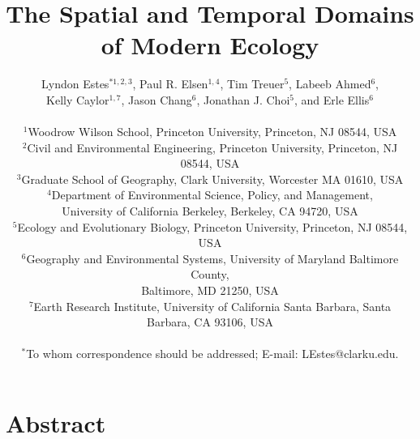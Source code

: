 \documentclass[12pt]{article}
\title{The Spatial and Temporal Domains of Modern Ecology }%
\author
{Lyndon Estes$^{\ast1, 2, 3}$, Paul R. Elsen$^{1, 4}$, Tim Treuer$^{5}$, Labeeb Ahmed$^{6}$, \\
Kelly Caylor$^{1, 7}$, Jason Chang$^{6}$, Jonathan J. Choi$^{5}$, and Erle Ellis$^{6}$ \\
\\
\normalsize{$^{1}$Woodrow Wilson School, Princeton University, Princeton, NJ 08544, USA}\\
\normalsize{$^{2}$Civil and Environmental Engineering, Princeton University, Princeton, NJ 08544, USA}\\
\normalsize{$^{3}$Graduate School of Geography, Clark University, Worcester MA 01610, USA}\\
\normalsize{$^{4}$Department of Environmental Science, Policy, and Management,}\\
\normalsize{University of California Berkeley, Berkeley, CA 94720, USA}\\
\normalsize{$^{5}$Ecology and Evolutionary Biology, Princeton University, Princeton, NJ 08544, USA}\\
\normalsize{$^{6}$Geography and Environmental Systems, University of Maryland Baltimore County,}\\ 
\normalsize{Baltimore, MD 21250, USA}\\
\normalsize{$^{7}$Earth Research Institute, University of California Santa Barbara, Santa Barbara, CA 93106, USA}\\
\\
\normalsize{$^\ast$To whom correspondence should be addressed; E-mail:  LEstes@clarku.edu.}}
\date{}
\newenvironment{sciabstract}{%
\begin{quote} \bf}
{\end{quote}}
\begin{document}
 


\baselineskip24pt


\maketitle 




\section*{Abstract}
\end{document}
